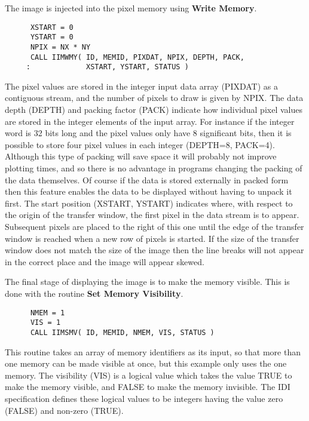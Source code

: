 The image is injected into the pixel memory using {\bf Write Memory}.
\begin{small}
\begin{verbatim}
      XSTART = 0
      YSTART = 0
      NPIX = NX * NY
      CALL IIMWMY( ID, MEMID, PIXDAT, NPIX, DEPTH, PACK,
     :             XSTART, YSTART, STATUS )
\end{verbatim}
\end{small}
The pixel values are stored in the integer input data array (PIXDAT)
as a contiguous stream, and the number of pixels to draw is given by
NPIX. The data depth (DEPTH) and packing factor (PACK) indicate how
individual pixel values are stored in the integer elements of the
input array. For instance if the integer word is 32 bits long and
the pixel values only have 8 significant bits, then it is possible
to store four pixel values in each integer (DEPTH=8, PACK=4).
Although this type of packing will save space it will probably not
improve plotting times, and so there is no advantage in programs
changing the packing of the data themselves. Of course if the data
is stored externally in packed form then this feature enables the data
to be displayed without having to unpack it first. The start position
(XSTART, YSTART) indicates where, with respect to the origin of the
transfer window, the first pixel in the data stream is to appear.
Subsequent pixels are placed to the right of this one until the edge
of the transfer window is reached when a new row of pixels is started.
If the size of the transfer window does not match the size of the
image then the line breaks will not appear in the correct place and
the image will appear skewed.

The final stage of displaying the image is to make the memory visible.
This is done with the routine {\bf Set Memory Visibility}.
\begin{small}
\begin{verbatim}
      NMEM = 1
      VIS = 1
      CALL IIMSMV( ID, MEMID, NMEM, VIS, STATUS )
\end{verbatim}
\end{small}
This routine takes an array of memory identifiers as its input, so
that more than one memory can be made visible at once, but this example
only uses the one memory. The visibility (VIS) is a logical value which
takes the value TRUE to make the memory visible, and FALSE to make
the memory invisible. The IDI specification defines these logical
values to be integers having the value zero (FALSE) and non-zero
(TRUE).

